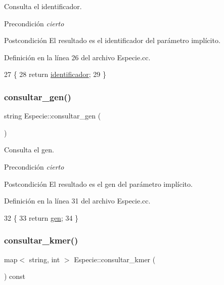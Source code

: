 Consulta el identificador. 

\begin{DoxyPrecond}{Precondición}
{\itshape cierto} 
\end{DoxyPrecond}
\begin{DoxyPostcond}{Postcondición}
El resultado es el identificador del parámetro implícito. 
\end{DoxyPostcond}


Definición en la línea 26 del archivo Especie.\+cc.


\begin{DoxyCode}
27 \{
28     \textcolor{keywordflow}{return} \hyperlink{class_especie_a9efba6a1733042dab5c3cb63533e0628}{identificador};
29 \}
\end{DoxyCode}
\mbox{\label{class_especie_a352a338730450aa182e747ed88280e55}} 
\subsubsection{\texorpdfstring{consultar\+\_\+gen()}{consultar\_gen()}}
{\footnotesize\ttfamily string Especie\+::consultar\+\_\+gen (\begin{DoxyParamCaption}{ }\end{DoxyParamCaption})}



Consulta el gen. 

\begin{DoxyPrecond}{Precondición}
{\itshape cierto} 
\end{DoxyPrecond}
\begin{DoxyPostcond}{Postcondición}
El resultado es el gen del parámetro implícito. 
\end{DoxyPostcond}


Definición en la línea 31 del archivo Especie.\+cc.


\begin{DoxyCode}
32 \{
33     \textcolor{keywordflow}{return} \hyperlink{class_especie_ac35bb565f7346cd6317b3a8c849456d1}{gen};
34 \}
\end{DoxyCode}
\mbox{\label{class_especie_a83ba0eee5730ca54986b741e982f1a07}} 
\subsubsection{\texorpdfstring{consultar\+\_\+kmer()}{consultar\_kmer()}}
{\footnotesize\ttfamily map$<$ string, int $>$ Especie\+::consultar\+\_\+kmer (\begin{DoxyParamCaption}{ }\end{DoxyParamCaption}) const}



